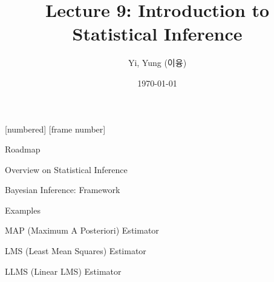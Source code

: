 

\csname\pdfmode\endcsname

{
  [numbered]
  [frame number]  %
}



\title[]{Lecture 9: Introduction to Statistical Inference}
\author{Yi, Yung (이융)}
\date{\today}








\begin{frame}
  \titlepage
\end{frame}





\begin{frame}{Roadmap}

\plitemsep 0.15in

\bce[(1)]

\item Overview on Statistical Inference

\item Bayesian Inference: Framework

\item Examples

\item MAP (Maximum A Posteriori) Estimator

\item LMS (Least Mean Squares) Estimator

\item LLMS (Linear LMS) Estimator



  
  \ece

\end{frame}

